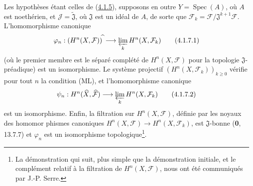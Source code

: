 \begin{corollary}[4.1.7]
\label{III.4.1.7-fr}
Les hypothèses étant celles de \textup{(\hyperref[III.4.1.5-fr]{4.1.5})}, supposons
en outre $Y=\operatorname{Spec}(A)$, où $A$ est noethérien, et
$\mathcal J=\widetilde{\mathfrak J}$, où $\mathfrak J$ est un idéal de
$A$, de sorte que
$\mathcal F_k=\mathcal F/\mathfrak J^{k+1}\mathcal F$.
L'homomorphisme canonique
\[
\varphi_n:(H^n(X,\mathcal F))^{\widehat{\,}}
\longrightarrow\varprojlim_kH^n(X,\mathcal F_k)
\tag{4.1.7.1}\label{III.4.1.7.1-fr}
\]
(où le premier membre est le séparé complété de $H^n(X,\mathcal F)$ pour
la topologie $\mathfrak J$-préadique) est un isomorphisme. Le système
projectif $(H^n(X,\mathcal F_k))_{k\geq0}$ vérifie pour tout $n$ la
condition \textup{(ML)}, et l'homomorphisme canonique
\[
\psi_n:H^n(\widehat X,\widehat{\mathcal F})
\longrightarrow\varprojlim_kH^n(X,\mathcal F_k)
\tag{4.1.7.2}\label{III.4.1.7.2-fr}
\]
est un isomorphisme. Enfin, la filtration sur $H^n(X,\mathcal F)$, définie
par les noyaux des homomor%
phismes canoniques
$H^n(X,\mathcal F)\to H^n(X,\mathcal F_k)$, est $\mathfrak J$-bonne
\textup{(\textbf{0}, 13.7.7)} et $\varphi_n$ est un isomorphisme topologique\footnote{La démonstration qui suit, plus simple que la démonstration
initiale, et le complément relatif à la filtration de
$H^n(X,\mathcal F)$, nous ont été communiqués par J.-P. Serre.}.
\end{corollary}


